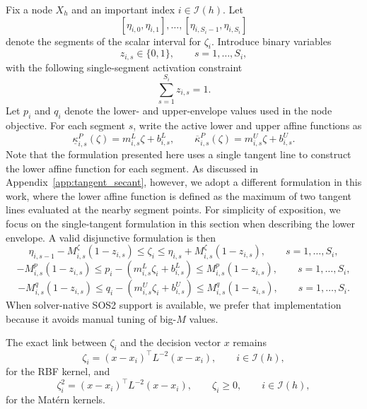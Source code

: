 \documentclass[pdflatex,sn-mathphys-num]{sn-jnl}%
\theoremstyle{thmstyleone}%
\theoremstyle{thmstyletwo}%
\theoremstyle{thmstylethree}%
\begin{document}
Fix a node $X_h$ and an important index $i\in\mathcal{I}(h)$. Let
\[
[\eta_{i,0},\eta_{i,1}],\ldots,[\eta_{i,S_i-1},\eta_{i,S_i}]
\]
denote the segments of the scalar interval for $\zeta_i$. Introduce binary variables
\[
z_{i,s}\in\{0,1\},
\qquad s=1,\ldots,S_i,
\]
with the following single-segment activation constraint
\begin{equation}
\sum_{s=1}^{S_i} z_{i,s}=1.
\label{eq:app_one_segment}
\end{equation}
Let $p_i$ and $q_i$ denote the lower- and upper-envelope values used in the node objective. For each segment $s$, write the active lower and upper affine functions as
\[
\underline{\kappa}^{P}_{i,s}(\zeta)=m^L_{i,s}\zeta+b^L_{i,s},
\qquad
\overline{\kappa}^{P}_{i,s}(\zeta)=m^U_{i,s}\zeta+b^U_{i,s}.
\]
Note that the formulation presented here uses a single tangent line to construct the lower affine function for each segment. As discussed in Appendix~\ref{app:tangent_secant}, however, we adopt a different formulation in this work, where the lower affine function is defined as the maximum of two tangent lines evaluated at the nearby segment points. For simplicity of exposition, we focus on the single-tangent formulation in this section when describing the lower envelope. A valid disjunctive formulation is then
\begin{equation}
\eta_{i,s-1}-M_{i,s}^{\zeta}(1-z_{i,s})
\le \zeta_i \le
\eta_{i,s}+M_{i,s}^{\zeta}(1-z_{i,s}),
\qquad s=1,\ldots,S_i,
\label{eq:app_seg_interval}
\end{equation}
\begin{equation}
-M_{i,s}^{p}(1-z_{i,s})
\le
p_i-\left(m^L_{i,s}\zeta_i+b^L_{i,s}\right)
\le
M_{i,s}^{p}(1-z_{i,s}),
\qquad s=1,\ldots,S_i,
\label{eq:app_seg_p}
\end{equation}
\begin{equation}
-M_{i,s}^{q}(1-z_{i,s})
\le
q_i-\left(m^U_{i,s}\zeta_i+b^U_{i,s}\right)
\le
M_{i,s}^{q}(1-z_{i,s}),
\qquad s=1,\ldots,S_i.
\label{eq:app_seg_q}
\end{equation}
When solver-native SOS2 support is available, we prefer that implementation because it avoids manual tuning of big-$M$ values.

The exact link between $\zeta_i$ and the decision vector $x$ remains
\begin{equation}
\zeta_i=(x-x_i)^\top L^{-2}(x-x_i),
\qquad i\in\mathcal{I}(h),
\label{eq:app_rbf_link}
\end{equation}
for the RBF kernel, and
\begin{equation}
\zeta_i^2=(x-x_i)^\top L^{-2}(x-x_i),
\qquad
\zeta_i\ge0,
\qquad i\in\mathcal{I}(h),
\label{eq:app_matern_link}
\end{equation}
for the Mat\'ern kernels.
\end{document}
